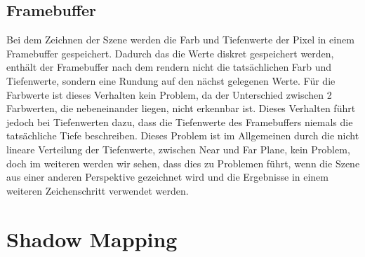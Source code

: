 \section{Framebuffer}
Bei dem Zeichnen der Szene werden die Farb und Tiefenwerte der Pixel in einem Framebuffer gespeichert.
Dadurch das die Werte diskret gespeichert werden, enthält der Framebuffer nach dem rendern nicht die tatsächlichen Farb und 
Tiefenwerte, sondern eine Rundung auf den nächst gelegenen Werte.
Für die Farbwerte ist dieses Verhalten kein Problem, da der Unterschied zwischen 2 Farbwerten, die nebeneinander liegen, nicht erkennbar ist.
Dieses Verhalten führt jedoch bei Tiefenwerten dazu, dass die Tiefenwerte des Framebuffers niemals die tatsächliche Tiefe beschreiben.
Dieses Problem ist im Allgemeinen durch die nicht lineare Verteilung der Tiefenwerte, zwischen Near und Far Plane, kein Problem, 
doch im weiteren werden wir sehen, dass dies zu Problemen führt, wenn die Szene aus einer anderen Perspektive gezeichnet wird 
und die Ergebnisse in einem weiteren Zeichenschritt verwendet werden.

\chapter{Shadow Mapping} %
\label{section:shadow-mapping}
